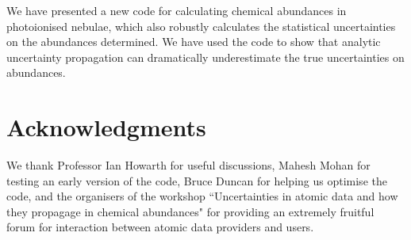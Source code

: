 \documentclass[useAMS,usenatbib]{mn2e}
\begin{document}
We have presented a new code for calculating chemical abundances in photoionised nebulae, which also robustly calculates the statistical uncertainties on the abundances determined.  We have used the code to show that analytic uncertainty propagation can dramatically underestimate the true uncertainties on abundances.

\section*{Acknowledgments}

We thank Professor Ian Howarth for useful discussions, Mahesh Mohan for testing an early version of the code, Bruce Duncan for helping us optimise the code, and the organisers of the workshop ``Uncertainties in atomic data and how they propagage in chemical abundances" for providing an extremely fruitful forum for interaction between atomic data providers and users.





\label{lastpage}
\end{document}
